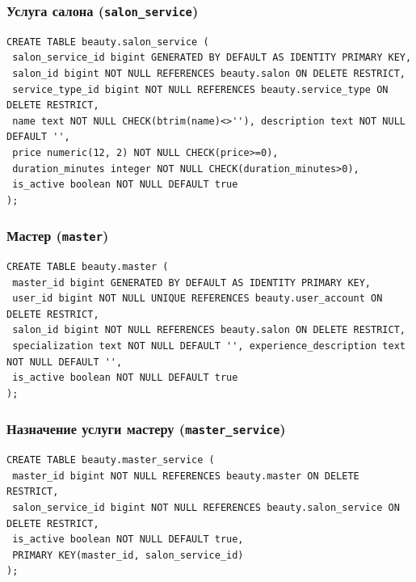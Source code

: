 \documentclass[11pt,a4paper]{article}
\begin{document}
\par\medskip\noindent\begin{minipage}{\linewidth}
\subsubsection*{Услуга салона (\texttt{salon\_\allowbreak{}service})}
\begin{lstlisting}[style=sql]
CREATE TABLE beauty.salon_service (
 salon_service_id bigint GENERATED BY DEFAULT AS IDENTITY PRIMARY KEY,
 salon_id bigint NOT NULL REFERENCES beauty.salon ON DELETE RESTRICT,
 service_type_id bigint NOT NULL REFERENCES beauty.service_type ON DELETE RESTRICT,
 name text NOT NULL CHECK(btrim(name)<>''), description text NOT NULL DEFAULT '',
 price numeric(12, 2) NOT NULL CHECK(price>=0),
 duration_minutes integer NOT NULL CHECK(duration_minutes>0),
 is_active boolean NOT NULL DEFAULT true
);
\end{lstlisting}
\end{minipage}\par\medskip
\par\medskip\noindent\begin{minipage}{\linewidth}
\subsubsection*{Мастер (\texttt{master})}
\begin{lstlisting}[style=sql]
CREATE TABLE beauty.master (
 master_id bigint GENERATED BY DEFAULT AS IDENTITY PRIMARY KEY,
 user_id bigint NOT NULL UNIQUE REFERENCES beauty.user_account ON DELETE RESTRICT,
 salon_id bigint NOT NULL REFERENCES beauty.salon ON DELETE RESTRICT,
 specialization text NOT NULL DEFAULT '', experience_description text NOT NULL DEFAULT '',
 is_active boolean NOT NULL DEFAULT true
);
\end{lstlisting}
\end{minipage}\par\medskip
\par\medskip\noindent\begin{minipage}{\linewidth}
\subsubsection*{Назначение услуги мастеру (\texttt{master\_\allowbreak{}service})}
\begin{lstlisting}[style=sql]
CREATE TABLE beauty.master_service (
 master_id bigint NOT NULL REFERENCES beauty.master ON DELETE RESTRICT,
 salon_service_id bigint NOT NULL REFERENCES beauty.salon_service ON DELETE RESTRICT,
 is_active boolean NOT NULL DEFAULT true,
 PRIMARY KEY(master_id, salon_service_id)
);
\end{lstlisting}
\end{minipage}\par\medskip
\end{document}

